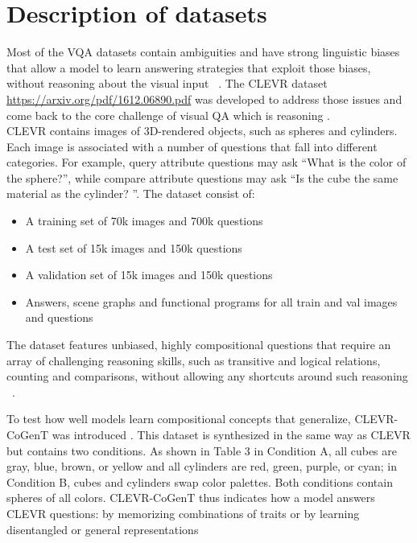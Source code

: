 \appendix

\section{Description of datasets}

Most of the VQA datasets contain ambiguities and have strong linguistic biases that allow a model to learn answering strategies that exploit those biases, without reasoning about the visual input ~\cite{Santoro2017ASN}.
The CLEVR dataset ~\cite{johnson2017clevr}  \href{url}{https://arxiv.org/pdf/1612.06890.pdf}  was developed to address those issues and come back to the core challenge of visual QA which is reasoning  .\\
CLEVR contains images of 3D-rendered objects, such as spheres and cylinders. Each image is associated with a number of questions that fall into different categories. For example, query attribute questions may ask “What is the color of the sphere?”, while compare attribute questions may ask “Is the cube the same material as the cylinder? ”.
The dataset consist of:
\begin{itemize}
\item 	A training set of 70k images and 700k questions
\item	A test  set of 15k images and 150k questions 
\item	A validation set of 15k images and 150k 
 questions
\item	Answers, scene graphs and functional programs for all train and val images and questions

\end{itemize}

The dataset features unbiased, highly compositional questions that require an array of challenging reasoning skills, such as transitive and logical relations, counting and comparisons, without allowing any shortcuts around such reasoning ~\cite{hudson2018compositional}.

To test how well models learn compositional concepts that generalize, CLEVR-CoGenT was introduced . This dataset is synthesized in the same way as CLEVR but contains two conditions. As shown in Table 3 in Condition A, all cubes are gray, blue, brown, or yellow and all cylinders are red, green, purple, or cyan; in Condition B, cubes and cylinders swap color palettes.
Both conditions contain spheres of all colors. CLEVR-CoGenT thus indicates how a model answers CLEVR questions: by memorizing combinations of traits or by learning disentangled or general representations ~\cite{perez2017film}

